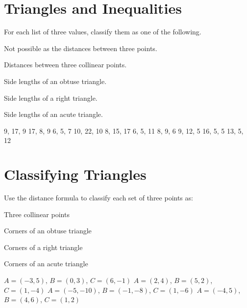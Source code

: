 \section*{Triangles and Inequalities}
For each list of three values, classify them as one of the following.
\begin{Clist}
\item Not possible as the distances between three points.
\item Distances between three collinear points.
\item Side lengths of an obtuse triangle.
\item Side lengths of a right triangle.
\item Side lengths of an acute triangle.
\end{Clist}
\begin{smenum}
\mitemxxxxx
{9, 17, 9}
{17, 8, 9}
{6, 5, 7}
{10, 22, 10}
{8, 15, 17}
\mitemxxxxx
{6, 5, 11}
{8, 9, 6}
{9, 12, 5}
{16, 5, 5}
{13, 5, 12}
\end{smenum}

\section*{Classifying Triangles}
Use the distance formula to classify each set of three points as:
\begin{Clist}
\item Three collinear points
\item Corners of an obtuse triangle
\item Corners of a right triangle
\item Corners of an acute triangle
\end{Clist}
\begin{smenum}
\mitemxx
{$A=(-3,5)$, $B=(0,3)$, $C=(6,-1)$}
{$A=(2,4)$, $B=(5,2)$, $C=(1,-4)$}
\mitemxx
{$A=(-5,-10)$, $B=(-1,-8)$, $C=(1,-6)$}
{$A=(-4,5)$, $B=(4,6)$, $C=(1,2)$}
\end{smenum}
\graphpage
